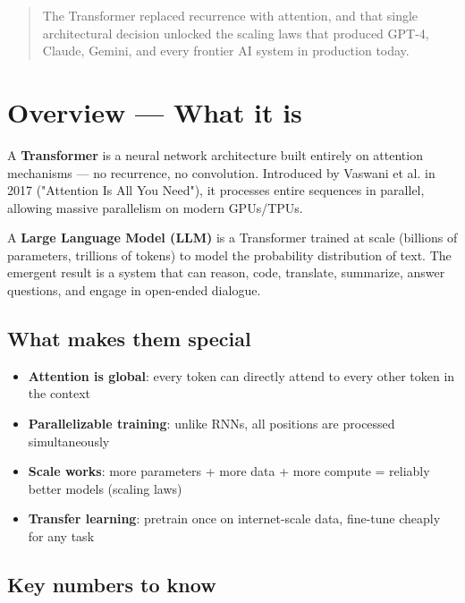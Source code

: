 \documentclass[11pt]{article}
\providecommand{\tightlist}{\setlength{\itemsep}{1pt}\setlength{\parskip}{0pt}}
\begin{document}
\makecoverpage

\thispagestyle{empty}
{\hypersetup{hidelinks}\tableofcontents}
\clearpage

\begin{quote}
The Transformer replaced recurrence with attention, and that single architectural decision unlocked the scaling laws that produced GPT-4, Claude, Gemini, and every frontier AI system in production today.
\end{quote}

\section{Overview --- What it is}\label{overview--what-it-is}

A \textbf{Transformer} is a neural network architecture built entirely on attention mechanisms --- no recurrence, no convolution. Introduced by Vaswani et al. in 2017 ("Attention Is All You Need"), it processes entire sequences in parallel, allowing massive parallelism on modern GPUs/TPUs.

A \textbf{Large Language Model (LLM)} is a Transformer trained at scale (billions of parameters, trillions of tokens) to model the probability distribution of text. The emergent result is a system that can reason, code, translate, summarize, answer questions, and engage in open-ended dialogue.

\subsection{What makes them special}\label{what-makes-them-special}

\begin{itemize}
\tightlist
\item
  \textbf{Attention is global}: every token can directly attend to every other token in the context
\item
  \textbf{Parallelizable training}: unlike RNNs, all positions are processed simultaneously
\item
  \textbf{Scale works}: more parameters + more data + more compute = reliably better models (scaling laws)
\item
  \textbf{Transfer learning}: pretrain once on internet-scale data, fine-tune cheaply for any task
\end{itemize}

\subsection{Key numbers to know}\label{key-numbers-to-know}
\end{document}
